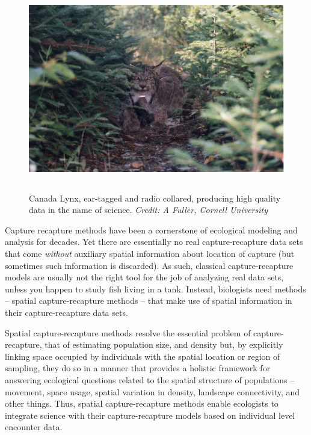 \begin{figure}[h!]
\centering
\includegraphics[height=3.5in]{Ch20-Last/lynx.jpg}
\caption{
Canada Lynx, ear-tagged and radio collared, producing high quality
data in the name of science. 
{\it Credit: A Fuller, Cornell University}  }
\label{fig.lynx}
\end{figure}


Capture recapture methods have been a cornerstone of ecological
modeling and analysis for decades.  Yet there are essentially no real
capture-recapture data sets that come {\it without} auxiliary spatial
information about location of capture (but sometimes such information
is discarded).  As such, classical capture-recapture
models are usually not the right tool for the job of analyzing real
data sets, unless you happen to study fish living in a tank.
Instead, biologists need methods -- spatial
capture-recapture methods -- that make use of spatial
information in their capture-recapture data sets.


Spatial capture-recapture methods resolve the essential problem of
capture-recapture, that of estimating population size, and density
but, by explicitly linking space occupied by individuals with the
spatial location or region of sampling, they do so in a manner that
provides a holistic framework for answering ecological questions
related to the spatial structure of populations -- movement, space
usage, spatial variation in density, landscape connectivity, and other
things.  Thus, spatial capture-recapture methods enable ecologists to
integrate science with their capture-recapture models based on
individual level encounter data.

